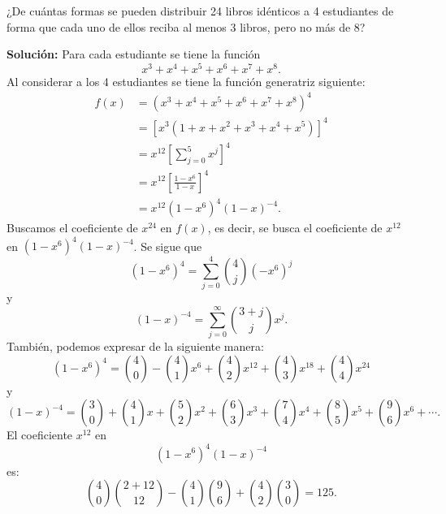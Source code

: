 \begin{myexample}
    ¿De cuántas formas se pueden distribuir 24 libros idénticos a 4 estudiantes de forma que cada uno de ellos reciba al menos 3 libros, pero no más de 8?

    \tcblower
    \textbf{\color{jblueleft}Solución:} Para cada estudiante se tiene la función
    $$x^3 + x^4 + x^5 + x^6 + x^7 + x^8.$$
    Al considerar a los 4 estudiantes se tiene la función generatriz siguiente:
    \begin{align*}
        f(x) & = \left( x^3 + x^4 + x^5 + x^6 + x^7 + x^8 \right)^4 \\
        & = \left[ x^3 \left( 1 + x + x^2 + x^3 + x^4 + x^5 \right)\right]^4 \\
        & = x^{12} \left[ \sum_{j=0}^5 x^j \right]^4 \\
        & = x^{12} \left[ \frac{1-x^6}{1-x} \right]^4 \\
        & = x^{12} \left( 1-x^6 \right)^4 (1-x)^{-4}.
    \end{align*}
    Buscamos el coeficiente de $x^{24}$ en $f(x)$, es decir, se busca el coeficiente de $x^{12}$ en $\left( 1-x^6 \right)^4 (1-x)^{-4}$. Se sigue que
    $$\left( 1-x^6 \right)^4 = \sum_{j=0}^4 \binom{4}{j}(-x^6)^j$$
    y
    $$(1-x)^{-4} = \sum_{j=0}^{\infty} \binom{3+j}{j}x^j.$$
    También, podemos expresar de la siguiente manera:
    $$\left( 1-x^6 \right)^4 = \binom{4}{0} - \binom{4}{1}x^6 + \binom{4}{2}x^{12} + \binom{4}{3}x^{18} + \binom{4}{4}x^{24}$$
    y
    $$(1-x)^{-4} = \binom{3}{0} + \binom{4}{1}x + \binom{5}{2}x^{2} + \binom{6}{3}x^{3} + \binom{7}{4}x^{4} + \binom{8}{5}x^{5} + \binom{9}{6}x^{6} + \cdots.$$
    El coeficiente $x^{12}$ en
    $$\left( 1-x^6 \right)^4 (1-x)^{-4}$$
    es:
    $$\binom{4}{0} \binom{2+12}{12} - \binom{4}{1} \binom{9}{6} + \binom{4}{2} \binom{3}{0} = 125.$$
\end{myexample}

